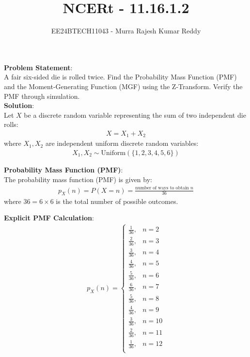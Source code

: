 \documentclass[journal]{IEEEtran}
\begin{document}
\title{NCERt - 11.16.1.2}
\author{EE24BTECH11043 - Murra Rajesh Kumar Reddy}
\maketitle

\textbf{Problem Statement}:\\
A fair six-sided die is rolled twice. Find the Probability Mass Function (PMF) and the Moment-Generating Function (MGF) using the Z-Transform. Verify the PMF through simulation.\\

\textbf{Solution}:\\
Let $X$ be a discrete random variable representing the sum of two independent die rolls:
\begin{align}
    X = X_1+X_2
\end{align}
where $X_1, X_2$ are independent uniform discrete random variables:
\begin{align}
    X_1, X_2 \sim \text{Uniform}(\{1,2,3,4,5,6\})
\end{align}

\textbf{Probability Mass Function (PMF)}:\\
The probability mass function (PMF) is given by:
\begin{align}
    p_X(n) = P(X = n) = \frac{\text{number of ways to obtain } n}{36}
\end{align}
where $36 = 6 \times 6$ is the total number of possible outcomes.

\textbf{Explicit PMF Calculation}:
\begin{align}
p_X(n) =
\begin{cases}
\frac{1}{36}, & n = 2 \\
\frac{2}{36}, & n = 3 \\
\frac{3}{36}, & n = 4 \\
\frac{4}{36}, & n = 5 \\
\frac{5}{36}, & n = 6 \\
\frac{6}{36}, & n = 7 \\
\frac{5}{36}, & n = 8 \\
\frac{4}{36}, & n = 9 \\
\frac{3}{36}, & n = 10 \\
\frac{2}{36}, & n = 11 \\
\frac{1}{36}, & n = 12 \\
\end{cases}
\end{align}
\end{document}
